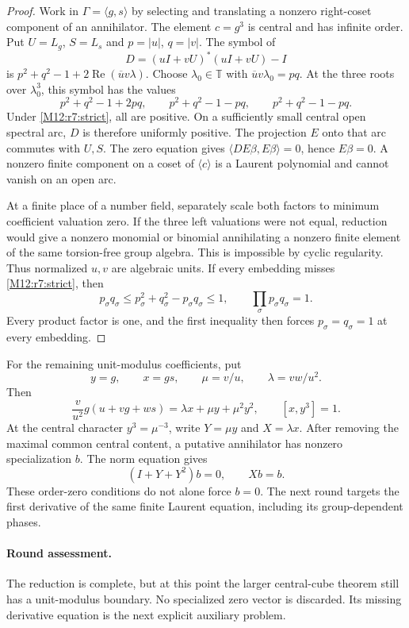 \documentclass[11pt,a4paper,oneside]{report}
\theoremstyle{definition}
\theoremstyle{remark}
\newcommand{\T}{\mathbb T}
\begin{document}
\begin{proof}
Work in $\Gamma=\langle g,s\rangle$ by selecting and translating a
nonzero right-coset component of an annihilator. The element $c=g^3$
is central and has infinite order. Put $U=L_g$, $S=L_s$ and
$p=|u|$, $q=|v|$. The symbol of
\[
 D=(uI+vU)^*(uI+vU)-I
\]
is $p^2+q^2-1+2\operatorname{Re}(\overline uv\lambda)$.
Choose $\lambda_0\in\T$ with $\overline uv\lambda_0=pq$.
At the three roots over $\lambda_0^3$, this symbol has the values
\[
 p^2+q^2-1+2pq,\qquad
 p^2+q^2-1-pq,\qquad p^2+q^2-1-pq.
\]
Under \eqref{M12:r7:strict}, all are positive. On a sufficiently small
central open spectral arc, $D$ is therefore uniformly positive.
The projection $E$ onto that arc commutes with $U,S$.
The zero equation gives
$\langle DE\beta,E\beta\rangle=0$, hence $E\beta=0$.
A nonzero finite component on a coset of $\langle c\rangle$
is a Laurent polynomial and cannot vanish on an open arc.

At a finite place of a number field, separately scale both factors
to minimum coefficient valuation zero. If the three left valuations
were not equal, reduction would give a nonzero monomial or binomial
annihilating a nonzero finite element of the same torsion-free group
algebra. This is impossible by cyclic regularity. Thus normalized
$u,v$ are algebraic units. If every embedding misses
\eqref{M12:r7:strict}, then
\[
 p_\sigma q_\sigma\le
 p_\sigma^2+q_\sigma^2-p_\sigma q_\sigma\le1,
 \qquad
 \prod_\sigma p_\sigma q_\sigma=1.
\]
Every product factor is one, and the first inequality then forces
$p_\sigma=q_\sigma=1$ at every embedding.
\end{proof}

For the remaining unit-modulus coefficients, put
\[
 y=g,\qquad x=gs,\qquad \mu=v/u,\qquad \lambda=vw/u^2.
\]
Then
\begin{equation}\label{M12:r7:change}
 \frac{v}{u^2}g(u+vg+ws)=\lambda x+\mu y+\mu^2y^2,
 \qquad [x,y^3]=1.
\end{equation}
At the central character $y^3=\mu^{-3}$, write $Y=\mu y$ and
$X=\lambda x$. After removing the maximal common central content,
a putative annihilator has nonzero specialization $b$. The norm
equation gives
\[
 (I+Y+Y^2)b=0,\qquad Xb=b.
\]
These order-zero conditions do not alone force $b=0$. The next
round targets the first derivative of the same finite Laurent
equation, including its group-dependent phases.

\paragraph{Round assessment.}
The reduction is complete, but at this point the larger central-cube
theorem still has a unit-modulus boundary. No specialized zero vector
is discarded. Its missing derivative equation is the next explicit
auxiliary problem.
\end{document}
